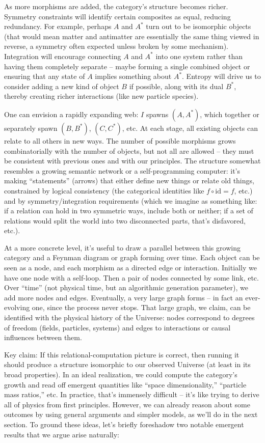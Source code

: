 \documentclass{article}
\begin{document}
As more morphisms are added, the category’s structure becomes richer. Symmetry constraints will identify certain composites as equal, reducing redundancy. For example, perhaps $A$ and $A^*$ turn out to be isomorphic objects (that would mean matter and antimatter are essentially the same thing viewed in reverse, a symmetry often expected unless broken by some mechanism). Integration will encourage connecting $A$ and $A^*$ into one system rather than having them completely separate – maybe forming a single combined object or ensuring that any state of $A$ implies something about $A^*$. Entropy will drive us to consider adding a new kind of object $B$ if possible, along with its dual $B^*$, thereby creating richer interactions (like new particle species).

One can envision a rapidly expanding web: $I$ spawns $(A,A^*)$, which together or separately spawn $(B,B^*)$, $(C,C^*)$, etc. At each stage, all existing objects can relate to all others in new ways. The number of possible morphisms grows combinatorially with the number of objects, but not all are allowed – they must be consistent with previous ones and with our principles. The structure somewhat resembles a growing semantic network or a self-programming computer: it’s making “statements” (arrows) that either define new things or relate old things, constrained by logical consistency (the categorical identities like $f \circ \mathrm{id} = f$, etc.) and by symmetry/integration requirements (which we imagine as something like: if a relation can hold in two symmetric ways, include both or neither; if a set of relations would split the world into two disconnected parts, that’s disfavored, etc.).

At a more concrete level, it’s useful to draw a parallel between this growing category and a Feynman diagram or graph forming over time. Each object can be seen as a node, and each morphism as a directed edge or interaction. Initially we have one node with a self-loop. Then a pair of nodes connected by some link, etc. Over “time” (not physical time, but an algorithmic generation parameter), we add more nodes and edges. Eventually, a very large graph forms – in fact an ever-evolving one, since the process never stops. That large graph, we claim, can be identified with the physical history of the Universe: nodes correspond to degrees of freedom (fields, particles, systems) and edges to interactions or causal influences between them.

Key claim: If this relational-computation picture is correct, then running it should produce a structure isomorphic to our observed Universe (at least in its broad properties). In an ideal realization, we could compute the category’s growth and read off emergent quantities like “space dimensionality,” “particle mass ratios,” etc. In practice, that’s immensely difficult – it’s like trying to derive all of physics from first principles. However, we can already reason about some outcomes by using general arguments and simpler models, as we’ll do in the next section. To ground these ideas, let’s briefly foreshadow two notable emergent results that we argue arise naturally:
\end{document}
